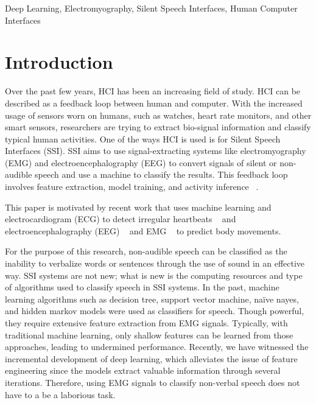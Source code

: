 \documentclass[conference]{IEEEtran}
\begin{document}
\begin{IEEEkeywords}
Deep Learning, Electromyography, Silent Speech Interfaces, Human Computer Interfaces
\end{IEEEkeywords}


%
\IEEEpeerreviewmaketitle


\section{Introduction}
Over the past few years, HCI has been an increasing field of study. HCI can be described as a feedback loop between human and computer. With the increased usage of sensors worn on humans, such as watches, heart rate monitors, and other smart sensors, researchers are trying to extract bio-signal information and classify typical human activities. One of the ways HCI is used is for Silent Speech Interfaces (SSI). SSI aims to use signal-extracting systems like electromyography (EMG) and electroencephalography (EEG) to convert signals of silent or non-audible speech and use a machine to classify the results. This feedback loop involves feature extraction, model training, and activity inference ~\cite{lukas_masuch_deep_nodate}.

This paper is motivated by recent work that uses machine learning and  electrocardiogram (ECG) to detect irregular heartbeats ~\cite{noauthor_classify_nodate} and electroencephalography (EEG) ~\cite{eltvik_deep_nodate} and EMG  ~\cite{altamirano_emg_nodate} to predict body movements. 

For the purpose of this research, non-audible speech can be classified as the inability to verbalize words or sentences through the use of sound in an effective way. SSI systems are not new; what is new is the computing resources and type of algorithms used to classify speech in SSI systems. In the past, machine learning algorithms such as decision tree, support vector machine, naïve nayes, and hidden markov models were used as classifiers for speech. Though powerful, they require extensive feature extraction from EMG signals. Typically, with traditional machine learning, only shallow features can be learned from those approaches, leading to undermined performance. Recently, we have witnessed the incremental development of deep learning, which alleviates the issue of feature engineering since the models extract valuable information through several iterations. Therefore, using EMG signals to classify non-verbal speech does not have to a be a laborious task.
\end{document}
